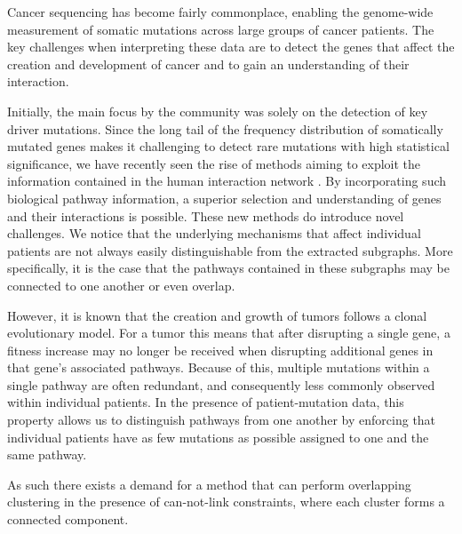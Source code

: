 \documentclass[conference,compsoc]{IEEEtran}
\begin{document}
Cancer sequencing has become fairly commonplace, enabling the genome-wide measurement of somatic mutations across large groups of cancer patients.
The key challenges when interpreting these data are to detect the genes that affect the creation and development of cancer and to gain an understanding of their interaction.

Initially, the main focus by the community was solely on the detection of key driver mutations. Since the long tail of the frequency distribution of somatically mutated genes makes it challenging to detect rare mutations with high statistical significance, we have recently seen the rise of methods aiming to exploit the information contained in the human interaction network \cite{some_methods}. By incorporating such biological pathway information, a superior selection and understanding of genes and their interactions is possible. These new methods do introduce novel challenges. We notice that the underlying mechanisms that affect individual patients are not always easily distinguishable from the extracted subgraphs. More specifically, it is the case that the pathways contained in these subgraphs may be connected to one another or even overlap.

However, it is known that the creation and growth of tumors follows a clonal evolutionary model. For a tumor this means that after disrupting a single gene, a fitness increase may no longer be received when disrupting additional genes in that gene's associated pathways. Because of this, multiple mutations within a single pathway are often redundant, and consequently less commonly observed within individual patients. In the presence of patient-mutation data, this property allows us to distinguish pathways from one another by enforcing that individual patients have as few mutations as possible assigned to one and the same pathway.

As such there exists a demand for a method that can perform overlapping clustering in the presence of can-not-link constraints, where each cluster forms a connected component.

\end{document}
